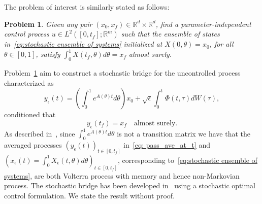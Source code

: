 \documentclass[12pt]{amsart}
\newtheorem{problem}{Problem}[section]
\newcommand{\R}{\mathbb{R}}
\renewcommand{\(}{\left (}
\renewcommand{\)}{\right )}
\numberwithin{equation}{section}
\begin{document}
The problem of interest is similarly stated as follows:
\begin{problem}\label{problem: stochastic}
Given any pair $(x_0,x_f)\in\R^d\times\R^d$, find a parameter-independent control process $u\in L^2([0,t_f];\mathbb{R}^m)$ such that the ensemble of states in~\eqref{eq:stochastic ensemble of systems} initialized at $X(0,\theta)=x_0$, for all $\theta\in[0,1]$, satisfy $\int_{0}^{1} X(t_f,\theta)d\theta=x_f$ almost surely.    
\end{problem}

Problem~\ref{problem: stochastic} aim to construct a stochastic bridge for the uncontrolled process characterized as
\begin{equation}\label{eq: pass_ave_at_t}
y_{\epsilon}(t)=\left(\int_0^1e^{A(\theta)t}d\theta\right) x_0+ \sqrt{\epsilon}\int_{0}^{t}\Phi(t,\tau) d W(\tau), 
\end{equation}
conditioned that 
\[
y_{\epsilon}(t_f)=x_f \quad\text{almost surely.}
\]
As described in~\cite{DOA-YC:23}, since $\int_0^1e^{A(\theta)t}d\theta$ is not a transition matrix we have that the averaged processes $(y_{\epsilon}(t))_{t\in[0,t_f]}$ in~\eqref{eq: pass_ave_at_t} and $\left(x_{\epsilon}(t)=\int_{0}^{1} X_{\epsilon}(t,\theta)d\theta\right)_{t\in[0,t_f]}$, corresponding to~\eqref{eq:stochastic ensemble of systems}, are both Volterra process with memory and hence non-Markovian process. The stochastic bridge has been developed in~\cite{DOA-YC:23} using a stochastic optimal control formulation. We state the result without proof.
\end{document}
